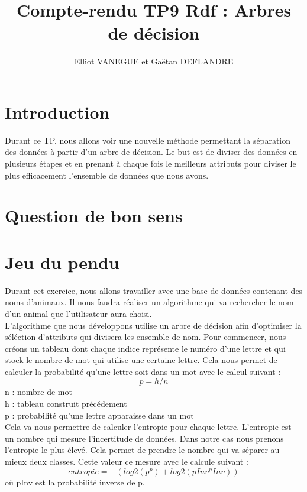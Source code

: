 \documentclass[a4paper,11pt]{article}
\title{Compte-rendu TP9 Rdf : Arbres de décision}
\author{Elliot VANEGUE et Gaëtan DEFLANDRE}
\begin{document}
  
  
  
  \maketitle
  
  \mbox{}
  \newpage
  \clearpage
  
  \section*{Introduction}
   Durant ce TP, nous allons voir une nouvelle méthode permettant la séparation des données à partir
   d'un arbre de décision. Le but est de diviser des données en plusieurs étapes et en prenant à chaque fois
   le meilleurs attributs pour diviser le plus efficacement l'ensemble de données que nous avons.

  \section{Question de bon sens}
  \section{Jeu du pendu}
  Durant cet exercice, nous allons travailler avec une base de données contenant des noms d'animaux. Il nous
  faudra réaliser un algorithme qui va rechercher le nom d'un animal que l'utilisateur aura choisi.\\
  
  L'algorithme que nous développons utilise un arbre de décision afin d'optimiser la séléction d'attributs qui
  divisera les ensemble de nom. Pour commencer, nous créons un tableau dont chaque indice représente le numéro
  d'une lettre et qui stock le nombre de mot qui utilise une certaine lettre. Cela nous permet de calculer
  la probabilité qu'une lettre soit dans un mot avec le calcul suivant :
  $$ p = h / n $$
  n : nombre de mot\\
  h : tableau construit précédement\\
  p : probabilité qu'une lettre apparaisse dans un mot\\
  
  Cela va nous permettre de calculer l'entropie pour chaque lettre. L'entropie est un nombre qui mesure
  l'incertitude de données. Dans notre cas nous prenons l'entropie le plus élevé. Cela permet de prendre
  le nombre qui va séparer au mieux deux classes. Cette valeur ce mesure avec le calcule suivant :
  $$entropie = -(log2(p ^ p) + log2(pInv ^ pInv))$$
  où pInv est la probabilité inverse de p.\\
  
\end{document}
